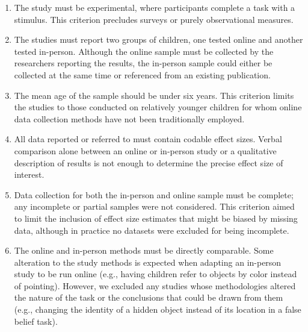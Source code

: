 \documentclass[
  man,floatsintext]{apa6}
\begin{document}
\begin{enumerate}
\def\labelenumi{\arabic{enumi}.}
\item
  The study must be experimental, where participants complete a task with a stimulus. This criterion precludes surveys or purely observational measures.
\item
  The studies must report two groups of children, one tested online and another tested in-person. Although the online sample must be collected by the researchers reporting the results, the in-person sample could either be collected at the same time or referenced from an existing publication.
\item
  The mean age of the sample should be under six years. This criterion limits the studies to those conducted on relatively younger children for whom online data collection methods have not been traditionally employed.
\item
  All data reported or referred to must contain codable effect sizes. Verbal comparison alone between an online or in-person study or a qualitative description of results is not enough to determine the precise effect size of interest.
\item
  Data collection for both the in-person and online sample must be complete; any incomplete or partial samples were not considered. This criterion aimed to limit the inclusion of effect size estimates that might be biased by missing data, although in practice no datasets were excluded for being incomplete.
\item
  The online and in-person methods must be directly comparable. Some alteration to the study methods is expected when adapting an in-person study to be run online (e.g., having children refer to objects by color instead of pointing). However, we excluded any studies whose methodologies altered the nature of the task or the conclusions that could be drawn from them (e.g., changing the identity of a hidden object instead of its location in a false belief task).
\end{enumerate}
\end{document}
